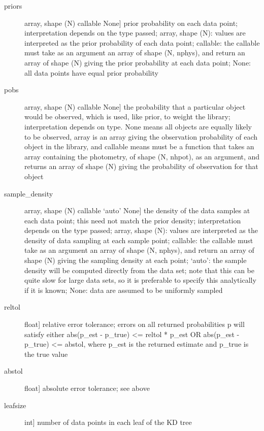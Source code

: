 \documentclass[letterpaper,10pt,english]{sphinxmanual}
\begin{document}
\begin{fulllineitems}
\begin{fulllineitems}
\begin{description}
\begin{description}
\item[{priors}] \leavevmode{[}array, shape (N) \textbar{} callable \textbar{} None{]}
prior probability on each data point; interpretation
depends on the type passed; array, shape (N): values are
interpreted as the prior probability of each data point;
callable: the callable must take as an argument an array
of shape (N, nphys), and return an array of shape (N)
giving the prior probability at each data point; None:
all data points have equal prior probability

\item[{pobs}] \leavevmode{[}array, shape (N) \textbar{} callable \textbar{} None{]}
the probability that a particular object would be observed,
which is used, like prior, to weight the library;
interpretation depends on type. None means all objects are
equally likely to be observed, array is an array giving the
observation probability of each object in the library, and
callable means must be a function that takes an array
containing the photometry, of shape (N, nhpot), as an
argument, and returns an array of shape (N) giving the
probability of observation for that object

\item[{sample\_density}] \leavevmode{[}array, shape (N) \textbar{} callable \textbar{} ‘auto’ \textbar{} None{]}
the density of the data samples at each data point; this
need not match the prior density; interpretation depends
on the type passed; array, shape (N): values are
interpreted as the density of data sampling at each
sample point; callable: the callable must take as an
argument an array of shape (N, nphys), and return an
array of shape (N) giving the sampling density at each
point; ‘auto’: the sample density will be computed
directly from the data set; note that this can be quite
slow for large data sets, so it is preferable to specify
this analytically if it is known; None: data are assumed
to be uniformly sampled

\item[{reltol}] \leavevmode{[}float{]}
relative error tolerance; errors on all returned
probabilities p will satisfy either
abs(p\_est - p\_true) \textless{}= reltol * p\_est   OR
abs(p\_est - p\_true) \textless{}= abstol,
where p\_est is the returned estimate and p\_true is the
true value

\item[{abstol}] \leavevmode{[}float{]}
absolute error tolerance; see above

\item[{leafsize}] \leavevmode{[}int{]}
number of data points in each leaf of the KD tree


\end{description}
\end{description}
\end{fulllineitems}
\end{fulllineitems}
\end{document}
